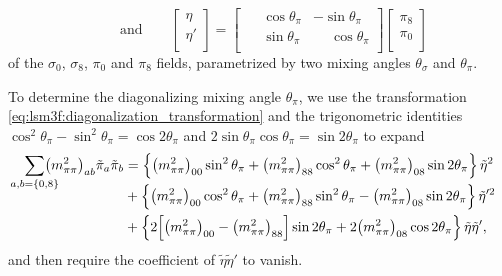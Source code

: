 \begin{itemize}
\begin{equation}
          \qquad \text{and} \qquad
          \begin{bmatrix} \eta \\ \eta' \\ \end{bmatrix} = \begin{bmatrix} \phantom{-} \cos \theta_\pi & -\sin \theta_\pi \\ \phantom{-} \sin \theta_\pi & \phantom{-} \cos \theta_\pi \\ \end{bmatrix} \begin{bmatrix} \pi_8 \\ \pi_0 \\ \end{bmatrix}
      \label{eq:lsm3f:diagonalization_transformation}
      \end{equation}
      of the $\sigma_0$, $\sigma_8$, $\pi_0$ and $\pi_8$ fields, parametrized by two mixing angles $\theta_\sigma$ and $\theta_\pi$.
\end{itemize}
To determine the diagonalizing mixing angle $\theta_\pi$,
we use the transformation \eqref{eq:lsm3f:diagonalization_transformation} and the trigonometric identities $\cos^2 \theta_\pi - \sin^2 \theta_\pi = \cos 2 \theta_\pi$ and $2 \sin\theta_\pi \cos\theta_\pi = \sin 2 \theta_\pi$ to expand
\begin{equation}
\begin{split}
	\smash{\smashoperator{\sum_{a,b=\{0,8\}}}} \big(m^2_{\pi\pi}\big)_{ab} \tilde{\pi}_a \tilde{\pi}_b &= \Big\{ \big(m^2_{\pi\pi}\big)_{00} \sin^2 \theta_\pi + \big(m^2_{\pi\pi}\big)_{88} \cos^2 \theta_\pi + \big(m^2_{\pi\pi}\big)_{08} \sin 2 \theta_\pi \Big\} \, \tilde{\eta}^2 \\
	                                                                                                   &+ \Big\{ \big(m^2_{\pi\pi}\big)_{00} \cos^2 \theta_\pi + \big(m^2_{\pi\pi}\big)_{88} \sin^2 \theta_\pi - \big(m^2_{\pi\pi}\big)_{08} \sin 2 \theta_\pi \Big\} \, \tilde{\eta}'^2 \\
	                                                                                                   &+ \Big\{ 2 \Big[ \big(m^2_{\pi\pi}\big)_{00} - \big(m^2_{\pi\pi}\big)_{88} \Big] \sin 2 \theta_\pi + 2 \big(m^2_{\pi\pi}\big)_{08} \cos 2 \theta_\pi \Big\} \, \tilde{\eta} \tilde{\eta}' ,
\end{split}
\label{eq:lsm3f:diagonalization_sum}
\end{equation}
and then require the coefficient of $\tilde{\eta} \tilde{\eta}'$ to vanish.
